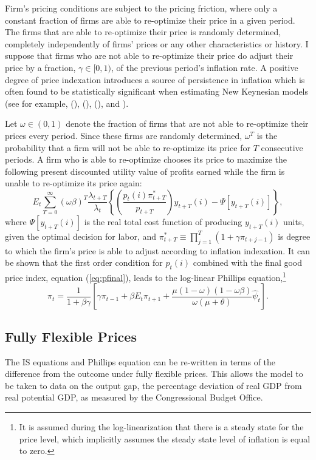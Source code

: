 \documentclass[10pt]{article}
\newcommand{\beq}{\begin{equation}}
\newcommand{\eeq}{\end{equation}}
\newcommand{\citee}[1]{\citet{#1}}
\newcommand{\h}[1]{\hat{#1}}
\begin{document}
Firm's pricing conditions are subject to the \citee{calvo1983} pricing friction, where only a constant fraction of firms are able to re-optimize their price in a given period.  The firms that are able to re-optimize their price is randomly determined, completely independently of firms' prices or any other characteristics or history.  I suppose that firms who are not able to re-optimize their price do adjust their price by a fraction, $\gamma \in [0,1)$, of the previous period's inflation rate.  A positive degree of price indexation introduces a source of persistence in inflation which is often found to be statistically significant when estimating New Keynesian models (see for example, \citeauthor*{smetswouters2005} (\citeyear{smetswouters2003}), (\citeyear{smetswouters2005}), (\citeyear{smetswouters2007}), and \citee{milani2007}).

Let $\omega \in (0,1)$ denote the fraction of firms that are not able to re-optimize their prices every period.  Since these firms are randomly determined, $\omega^T$ is the probability that a firm will not be able to re-optimize its price for $T$ consecutive periods.  A firm who is able to re-optimize chooses its price to maximize the following present discounted utility value of profits earned while the firm is unable to re-optimize its price again: 
\beq \label{eq:intprofit}
E_t \sum_{T=0}^{\infty} \left(\omega \beta \right)^{T} \frac{\lambda_{t+T}}{\lambda_t}
\left\{ \left(\frac{p_{t}(i) \pi_{t+T}^{*}}{p_{t+T}}\right) y_{t+T}(i) - \Psi\left[y_{t+T}(i)\right] \right\},
\eeq
where $\Psi\left[y_{t+T}(i)\right]$ is the real total cost function of producing $y_{t+T}(i)$ units, given the optimal decision for labor, and $\pi_{t+T}^{*} \equiv \prod_{j=1}^{T} (1+\gamma \pi_{t+j-1})$ is degree to which the firm's price is able to adjust according to inflation indexation.  It can be shown that the first order condition for $p_{t}(i)$ combined with the final good price index, equation (\ref{eq:pfinal}), leads to the log-linear Phillips equation,\footnote{It is assumed during the log-linearization that there is a steady state for the price level, which implicitly assumes the steady state level of inflation is equal to zero.}
\beq \label{eq:phillips} \pi_t = \frac{1}{1+\beta \gamma} \left[ \gamma \pi_{t-1} + \beta E_t \pi_{t+1} + \frac{\mu (1-\omega)(1-\omega \beta)}{\omega (\mu + \theta)} \h{\psi}_t \right]. \eeq

\subsection{Fully Flexible Prices}
The IS equations and Phillips equation can be re-written in terms of the difference from the outcome under fully flexible prices.  This allows the model to be taken to data on the output gap, the percentage deviation of real GDP from real potential GDP, as measured by the Congressional Budget Office.  
\end{document}
